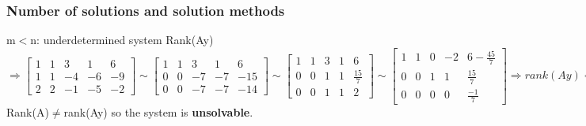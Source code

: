 \begin{frame}
	\frametitle{Number of solutions and solution methods}
	\begin{block}{m$<$n: underdetermined system}
		Rank(Ay) $\Rightarrow \begin{bmatrix}
		1 & 1 & 3 & 1 & 6\\
		1 & 1 & -4 & -6 & -9\\
		2 & 2 & -1 & -5 & -2
		\end{bmatrix} \sim \begin{bmatrix}
		1 & 1 & 3 & 1 & 6\\
		0 & 0 & -7 & -7 & -15\\
		0 & 0 & -7 & -7 & -14
		\end{bmatrix} \sim \begin{bmatrix}
		1 & 1 & 3 & 1 & 6\\
		0 & 0 & 1 & 1 & \frac{15}{7}\\
		0 & 0 & 1 & 1 & 2
		\end{bmatrix} \sim \begin{bmatrix}
		1 & 1 & 0 & -2 & 6-\frac{45}{7}\\
		0 & 0 & 1 & 1 & \frac{15}{7}\\
		0 & 0 & 0 & 0 & \frac{-1}{7}
		\end{bmatrix} \Rightarrow rank(Ay)=3$\vspace{2mm}
		Rank(A)$\neq$rank(Ay) so the system is \textbf{unsolvable}.
	\end{block}
\end{frame}

